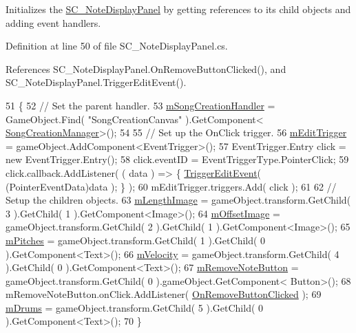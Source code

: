Initializes the \hyperlink{class_s_c___note_display_panel}{S\+C\+\_\+\+Note\+Display\+Panel} by getting references to its child objects and adding event handlers. 



Definition at line 50 of file S\+C\+\_\+\+Note\+Display\+Panel.\+cs.



References S\+C\+\_\+\+Note\+Display\+Panel.\+On\+Remove\+Button\+Clicked(), and S\+C\+\_\+\+Note\+Display\+Panel.\+Trigger\+Edit\+Event().


\begin{DoxyCode}
51     \{
52         \textcolor{comment}{// Set the parent handler.}
53         \hyperlink{group___s_c___n_d_p_priv_var_ga5e4ae5e7daa568c3e2b471c0835600c6}{mSongCreationHandler} = GameObject.Find( \textcolor{stringliteral}{"SongCreationCanvas"} ).GetComponent<
      \hyperlink{class_song_creation_manager}{SongCreationManager}>();
54 
55         \textcolor{comment}{// Set up the OnClick trigger.}
56         \hyperlink{group___s_c___n_d_p_priv_var_ga3dd3e8ce9fbbe9b6b11d87e28df7dcfa}{mEditTrigger} = gameObject.AddComponent<EventTrigger>();
57         EventTrigger.Entry click = \textcolor{keyword}{new} EventTrigger.Entry();
58         click.eventID = EventTriggerType.PointerClick;
59         click.callback.AddListener( ( data ) => \{ \hyperlink{group___s_c___n_d_p_handlers_ga7b25bcc6b76ae0894ac6eefde417caf1}{TriggerEditEvent}( (PointerEventData)data 
      ); \} );
60         mEditTrigger.triggers.Add( click );
61 
62         \textcolor{comment}{// Setup the children objects.}
63         \hyperlink{group___s_c___n_d_p_priv_var_ga611f26eaf6a960570b0dd848b6712b5f}{mLengthImage} = gameObject.transform.GetChild( 3 ).GetChild( 1 ).GetComponent<Image>();
64         \hyperlink{group___s_c___n_d_p_priv_var_ga177d14cf2cac316a0bfc2e1096256a0c}{mOffsetImage} = gameObject.transform.GetChild( 2 ).GetChild( 1 ).GetComponent<Image>();
65         \hyperlink{group___s_c___n_d_p_priv_var_ga8018aa4f7b333a7129badf082f233a3c}{mPitches} = gameObject.transform.GetChild( 1 ).GetChild( 0 ).GetComponent<Text>();
66         \hyperlink{group___s_c___n_d_p_priv_var_ga4924aa3f63f171ed33f5f85d11a760c4}{mVelocity} = gameObject.transform.GetChild( 4 ).GetChild( 0 ).GetComponent<Text>();
67         \hyperlink{group___s_c___n_d_p_priv_var_gac9af0bdc5b04a52ab9e7c13a0ad01ab7}{mRemoveNoteButton} = gameObject.transform.GetChild( 0 ).gameObject.GetComponent<
      Button>();
68         mRemoveNoteButton.onClick.AddListener( \hyperlink{group___s_c___n_d_p_handlers_ga0b545f6cd12ce56258842cb1036bceec}{OnRemoveButtonClicked} );
69         \hyperlink{group___s_c___n_d_p_priv_var_gadd38ff2acddedee4b6165f2fc48fd43c}{mDrums} = gameObject.transform.GetChild( 5 ).GetChild( 0 ).GetComponent<Text>();
70     \}
\end{DoxyCode}
\mbox{\label{group___s_c___n_d_p_unity_ga1038892636ae54a79c675287c4bb6fff}} 
